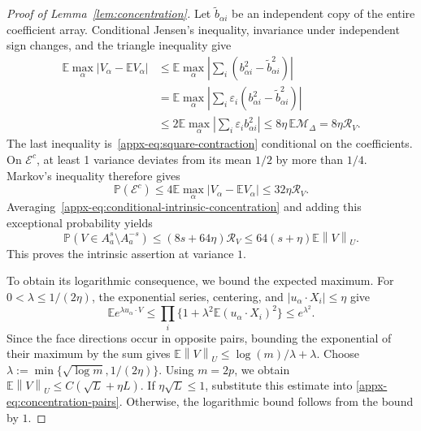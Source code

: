\documentclass[11pt,letterpaper]{article}
\theoremstyle{remark}
\newcommand{\E}{\mathbb E}
\newcommand{\Pp}{\mathbb P}
\newcommand{\norm}[1]{\left\lVert#1\right\rVert}
\begin{document}
\begin{proof}[Proof of Lemma~\ref{lem:concentration}]
Let \(\widetilde b_{\alpha i}\) be an independent copy of the entire
coefficient array. Conditional Jensen's inequality, invariance under
independent sign changes, and the triangle inequality give
\begin{align*}
 \E\max_\alpha|V_\alpha-\E V_\alpha|
 &\le\E\max_\alpha
       \left|\sum_i(b_{\alpha i}^2-\widetilde b_{\alpha i}^2)\right|\\
 &=\E\max_\alpha
       \left|\sum_i\varepsilon_i
                  (b_{\alpha i}^2-\widetilde b_{\alpha i}^2)\right|\\
 &\le2\E\max_\alpha\left|\sum_i\varepsilon_i b_{\alpha i}^2\right|
 \le8\eta\,\E\mathcal M_\Delta
 =8\eta\mathcal R_V.
\end{align*}
The last inequality is~\eqref{appx-eq:square-contraction}
conditional on the coefficients. On \(\mathcal E^c\), at least
1 variance deviates from its mean \(1/2\) by more than \(1/4\).
Markov's inequality therefore gives
\begin{equation}
 \Pp(\mathcal E^c)
 \le4\E\max_\alpha|V_\alpha-\E V_\alpha|
 \le32\eta\mathcal R_V.
 \label{appx-eq:conditional-variance}
\end{equation}
Averaging~\eqref{appx-eq:conditional-intrinsic-concentration} and
adding this exceptional probability yields
\begin{equation}
 \Pp(V\in A_a^s\setminus A_a^{-s})
 \le(8s+64\eta)\mathcal R_V
 \le64(s+\eta)\E\norm{V}_U.
 \label{appx-eq:concentration-pairs}
\end{equation}
This proves the intrinsic assertion at variance \(1\).

To obtain its logarithmic consequence, we bound the expected maximum.
For \(0<\lambda\le1/(2\eta)\), the exponential series, centering,
and \(|u_\alpha\cdot X_i|\le\eta\) give
\[
 \E e^{\lambda u_\alpha\cdot V}
 \le\prod_i\{1+\lambda^2\E(u_\alpha\cdot X_i)^2\}
 \le e^{\lambda^2}.
\]
Since the face directions occur in opposite pairs, bounding the
exponential of their maximum by the sum gives
\(\E\norm{V}_U\le\log(m)/\lambda+\lambda\).
Choose \(\lambda:=\min\{\sqrt{\log m},1/(2\eta)\}\).
Using \(m=2p\), we obtain
\(\E\norm{V}_U\le C(\sqrt L+\eta L)\).
If \(\eta\sqrt L\le1\), substitute this estimate into
\eqref{appx-eq:concentration-pairs}. Otherwise, the logarithmic bound
follows from the bound by \(1\).


\end{proof}
\end{document}
